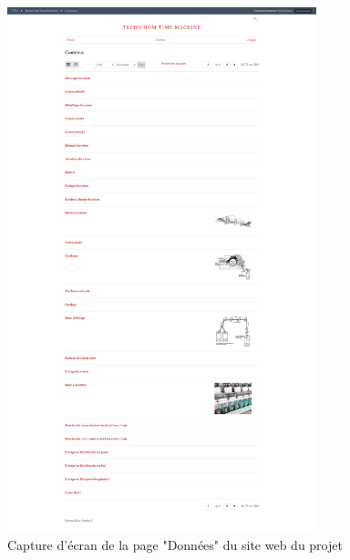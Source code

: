 \begin{figure} [H]
    \centering
    \includegraphics[width=0.8\textwidth]{assets/annexes/omeka_items.png}
    \caption{Capture d'écran de la page "Données" du site web du projet}
    \label{fig:pageDonnéesOmeka}
\end{figure}
